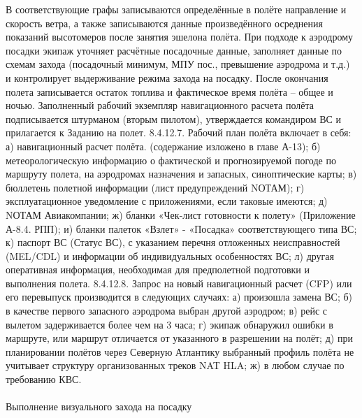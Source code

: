 В соответствующие графы записываются определённые в полёте направление и скорость ветра, а также записываются данные произведённого осреднения показаний высотомеров после занятия эшелона полёта.
При подходе к аэродрому посадки экипаж уточняет расчётные посадочные данные, заполняет данные по схемам захода (посадочный минимум, МПУ пос., превышение аэродрома и т.д.) и контролирует выдерживание режима захода на посадку. 
После окончания полета записывается остаток топлива и фактическое время полёта – общее и ночью. Заполненный рабочий экземпляр навигационного расчета полёта подписывается штурманом (вторым пилотом), утверждается командиром ВС и прилагается к Заданию на полет.
8.4.12.7. Рабочий план полёта включает в себя: 
а)	навигационный расчет полёта. (содержание изложено в главе А-13); 
б)	метеорологическую информацию о фактической и прогнозируемой погоде по маршруту полета, на аэродромах назначения и запасных, синоптические карты;
в)	бюллетень полетной информации (лист предупреждений NОТАМ); 
г)	эксплуатационное уведомление с приложениями, если таковые имеются;
д)	NОТАМ Авиакомпании; 
ж)  бланки «Чек-лист готовности к полету» (Приложение А-8.4. РПП); 
и)  бланки палеток «Взлет» - «Посадка» соответствующего типа ВС; 
к)  паспорт ВС (Статус ВС), с указанием перечня отложенных неисправностей (MEL/CDL) и информации об индивидуальных особенностях ВС; 
л) другая оперативная информация, необходимая для предполетной подготовки и выполнения полета. 
8.4.12.8. Запрос на новый навигационный расчет (CFP) или его перевыпуск производится в следующих случаях: 
а)	произошла замена ВС; 
б)	в качестве первого запасного аэродрома выбран другой аэродром; 
в)	рейс с вылетом задерживается более чем на 3 часа; 
г)	экипаж обнаружил ошибки в маршруте, или маршрут отличается от указанного в разрешении на полёт; 
д)	при планировании полётов через Северную Атлантику выбранный профиль полёта не учитывает структуру организованных треков NAT HLA; 
ж)  в любом случае по требованию КВС. 





\paragraph{} \label{sec:visual}	Выполнение визуального захода на посадку
